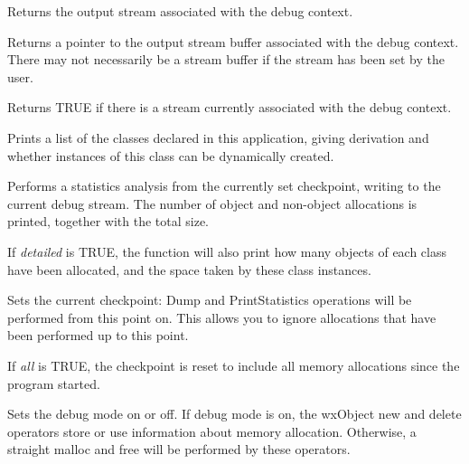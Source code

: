 
Returns the output stream associated with the debug context.



Returns a pointer to the output stream buffer associated with the debug context.
There may not necessarily be a stream buffer if the stream has been set
by the user.



Returns TRUE if there is a stream currently associated
with the debug context.



Prints a list of the classes declared in this application, giving derivation
and whether instances of this class can be dynamically created.



Performs a statistics analysis from the currently set checkpoint, writing
to the current debug stream. The number of object and non-object
allocations is printed, together with the total size.

If {\it detailed} is TRUE, the function will also print how many
objects of each class have been allocated, and the space taken by
these class instances.




Sets the current checkpoint: Dump and PrintStatistics operations will
be performed from this point on. This allows you to ignore allocations
that have been performed up to this point.

If {\it all} is TRUE, the checkpoint is reset to include all
memory allocations since the program started.



Sets the debug mode on or off. If debug mode is on, the wxObject new and delete
operators store or use information about memory allocation. Otherwise,
a straight malloc and free will be performed by these operators.

